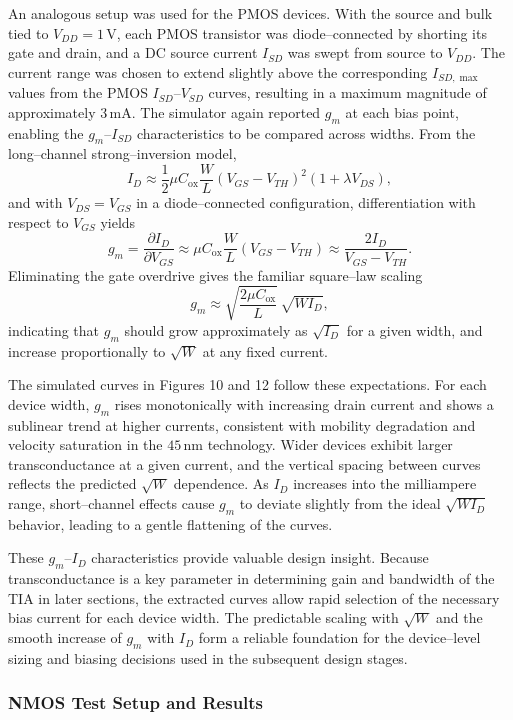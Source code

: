 \documentclass[11pt]{article}
\begin{document}
An analogous setup was used for the PMOS devices. With the source and bulk tied
to $V_{DD}=1\,\mathrm{V}$, each PMOS transistor was diode–connected by shorting
its gate and drain, and a DC source current $I_{SD}$ was swept from source to
$V_{DD}$. The current range was chosen to extend slightly above the
corresponding $I_{SD,\max}$ values from the PMOS $I_{SD}$–$V_{SD}$ curves,
resulting in a maximum magnitude of approximately $3\,\mathrm{mA}$. The simulator
again reported $g_m$ at each bias point, enabling the $g_m$–$I_{SD}$
characteristics to be compared across widths. From the long–channel strong–inversion model,
\[
  I_D \approx \frac{1}{2}\mu C_{\mathrm{ox}}\frac{W}{L}(V_{GS}-V_{TH})^2(1+\lambda V_{DS}),
\]
and with $V_{DS}=V_{GS}$ in a diode–connected configuration, differentiation
with respect to $V_{GS}$ yields
\[
  g_m = \frac{\partial I_D}{\partial V_{GS}}
  \approx \mu C_{\mathrm{ox}}\frac{W}{L}(V_{GS}-V_{TH})
  \approx \frac{2I_D}{V_{GS}-V_{TH}}.
\]
Eliminating the gate overdrive gives the familiar square–law scaling
\[
  g_m \approx \sqrt{\frac{2\mu C_{\mathrm{ox}}}{L}}\,\sqrt{W I_D},
\]
indicating that $g_m$ should grow approximately as $\sqrt{I_D}$ for a given
width, and increase proportionally to $\sqrt{W}$ at any fixed current.

The simulated curves in Figures 10 and 12 follow these expectations. For each device width, $g_m$ rises monotonically with increasing drain current and shows a sublinear trend at higher currents, consistent with mobility degradation and velocity saturation in the $45\,\mathrm{nm}$ technology. Wider devices exhibit larger transconductance at a given current, and the vertical spacing between curves reflects the predicted $\sqrt{W}$ dependence. As $I_D$ increases into the milliampere range, short–channel effects cause $g_m$ to deviate slightly from the ideal $\sqrt{W I_D}$ behavior, leading to a gentle flattening of the curves.

These $g_m$–$I_D$ characteristics provide valuable design insight. Because
transconductance is a key parameter in determining gain and bandwidth of the TIA
in later sections, the extracted curves allow rapid selection of the necessary
bias current for each device width. The predictable scaling with $\sqrt{W}$ and
the smooth increase of $g_m$ with $I_D$ form a reliable foundation for the
device–level sizing and biasing decisions used in the subsequent design stages.

\newpage

\subsubsection{NMOS Test Setup and Results}
\end{document}
